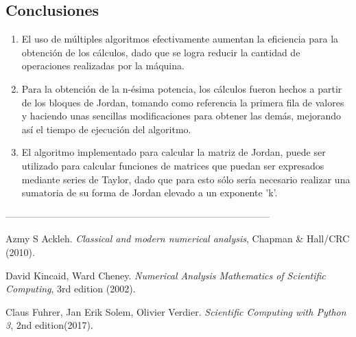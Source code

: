 \documentclass[12pt,a4paper]{article}
\begin{document}
\begin{multicols}{2}
	\section{Conclusiones}
	\begin{enumerate}
		\item El uso de múltiples algoritmos efectivamente aumentan la eficiencia para la obtención de los cálculos, dado que se logra reducir la cantidad de operaciones realizadas por la máquina.
		\item Para la obtención de la n-ésima potencia, los cálculos fueron hechos a partir de los bloques de Jordan, tomando como referencia la primera fila de valores y haciendo unas sencillas modificaciones para obtener las demás, mejorando así el tiempo de ejecución del algoritmo.
		\item El algoritmo implementado para calcular la matriz de Jordan, puede ser utilizado para calcular funciones de matrices que puedan ser expresados mediante series de Taylor, dado que para esto sólo sería necesario realizar una sumatoria de su forma de Jordan elevado a un exponente 'k'. 
	\end{enumerate}
\end{multicols}

\begin{center}
 -----------------------------------------------------------------------------------
\end{center}
\begin{multicols}{2}
\begin{list}{}{\setlength{\topsep}{0mm}\setlength{\itemsep}{0mm}%
\setlength{\parsep}{0mm}\setlength{\leftmargin}{4mm}}
%
\small
\item[1.] Azmy S Ackleh. \textit{Classical and modern numerical analysis}, Chapman \& Hall/CRC (2010).
\item[2.] David Kincaid, Ward Cheney. \textit{Numerical Analysis Mathematics of Scientific Computing}, 3rd edition (2002).
\item[3.] Claus Fuhrer, Jan Erik Solem, Olivier Verdier. \textit{Scientific Computing with Python 3}, 2nd edition(2017).
%
\end{list}
\end{multicols}
\end{document}
